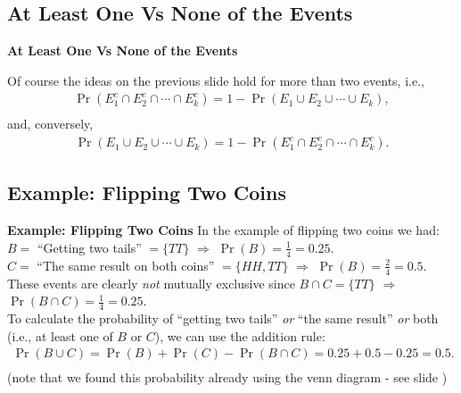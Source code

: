 \documentclass[compress]{beamer}        %
\makeatletter
\newcommand{\tcb}{\textcolor{beamer@blendedblue}}
\makeatother
\begin{document}
\subsection{At Least One Vs None of the Events}
\begin{frame}{\bf \tcb{At Least One Vs None of the Events}}

Of course the ideas on the previous slide hold for more than two events, i.e.,\\[-0.1cm]
\begin{align*}
\boxed{\Pr(E_1^c \cap E_2^c \cap \cdots \cap E_k^c) = 1 - \Pr(E_1 \cup E_2 \cup \cdots \cup E_k)},\\[-0.2cm]
\end{align*}
and, conversely,\\[-0.1cm]
\begin{align*}
\boxed{\Pr(E_1 \cup E_2 \cup \cdots \cup E_k) = 1 - \Pr(E_1^c \cap E_2^c \cap \cdots \cap E_k^c)}.
\end{align*}


\end{frame}


\subsection{Example: Flipping Two Coins}
\begin{frame}{\bf \tcb{Example: Flipping Two Coins}}
In the example of flipping two coins we had:\\[0.2cm]
$B =$ ``Getting two tails'' $= \{TT\}$ $\Rightarrow$ $\Pr(B) = \tfrac{1}{4} = 0.25$.\\[0.3cm]
$C =$ ``The same result on both coins'' $= \{HH, TT\}$ $\Rightarrow$ $\Pr(B) = \tfrac{2}{4} = 0.5$.\\[0.7cm]

These events are clearly \emph{not} mutually exclusive since $B \cap C = \{TT\}$ $\Rightarrow$ $\Pr(B \cap C) = \tfrac{1}{4} = 0.25$.\\[0.7cm]

To calculate the probability of ``getting two tails'' \emph{or} ``the same result'' \emph{or} both (i.e., at least one of $B$ or $C$), we can use the addition rule:\\[-0.6cm]
\begin{align*}
\Pr(B \cup C) = \Pr(B) + \Pr(C) - \Pr(B \cap C) = 0.25 + 0.5 - 0.25 = 0.5.\\[-0.4cm]
\end{align*}
{\footnotesize(note that we found this probability already using the venn diagram - see slide \pageref{vennexample})}
\end{frame}
\end{document}
